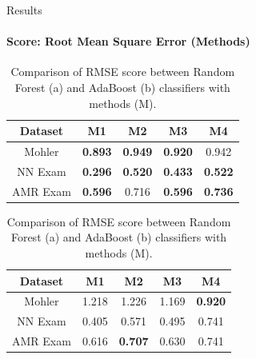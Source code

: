 \documentclass[aspectratio=169]{beamer}
\begin{document}
\begin{frame}{Results}
\framesubtitle{Score: Root Mean Square Error (Methods)}
\begin{table}
	\begin{subtable}[c]{0.5\textwidth}
		\centering
		\begin{tabular}{|c|c|c|c|c|}
			\hline
			Dataset & M1 & M2 & M3 & M4 \\
			\hline
			Mohler \cite{} & \textbf{0.893}  &\textbf{0.949} &\textbf{0.920} &0.942 \\
			\hline
			NN Exam \cite{} &\textbf{0.296} &\textbf{0.520} &\textbf{0.433} &\textbf{0.522} \\
			\hline
			AMR Exam \cite{} &\textbf{0.596} &0.716 &\textbf{0.596} & \textbf{0.736} \\
			\hline
		\end{tabular}
		\subcaption{}
	\end{subtable}
	\begin{subtable}[c]{0.5\textwidth}
		\centering
		\begin{tabular}{|c|c|c|c|c|}
			\hline
			Dataset & M1 & M2 & M3 & M4 \\
			\hline
			Mohler \cite{} &1.218  &1.226 &1.169 &\textbf{0.920} \\
			\hline
			NN Exam \cite{} &0.405 &0.571 &{0.495} &0.741 \\
			\hline
			AMR Exam \cite{} &0.616 &\textbf{0.707} &0.630 &{0.741} \\
			\hline
		\end{tabular}	
		\subcaption{}
	\end{subtable}
	\caption{Comparison of RMSE score between Random Forest (a) and AdaBoost (b) classifiers with methods (M).}
\end{table}
\end{frame}
\end{document}
